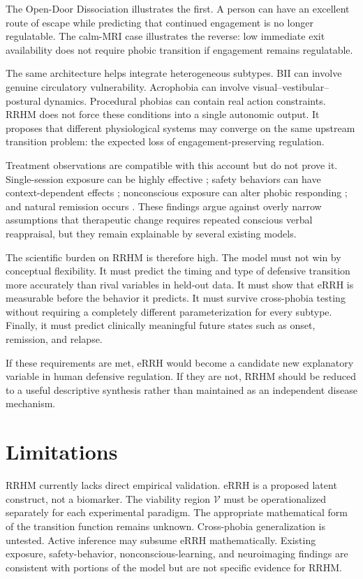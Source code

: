 \documentclass[11pt]{article}
\begin{document}
The Open-Door Dissociation illustrates the first. A person can have an excellent route of escape while predicting that continued engagement is no longer regulatable. The calm-MRI case illustrates the reverse: low immediate exit availability does not require phobic transition if engagement remains regulatable.

The same architecture helps integrate heterogeneous subtypes. BII can involve genuine circulatory vulnerability. Acrophobia can involve visual--vestibular--postural dynamics. Procedural phobias can contain real action constraints. RRHM does not force these conditions into a single autonomic output. It proposes that different physiological systems may converge on the same upstream transition problem: the expected loss of engagement-preserving regulation.

Treatment observations are compatible with this account but do not prove it. Single-session exposure can be highly effective \cite{odgers2022}; safety behaviors can have context-dependent effects \cite{meckes2025}; nonconscious exposure can alter phobic responding \cite{siegel2025}; and natural remission occurs \cite{trumpf2009remission}. These findings argue against overly narrow assumptions that therapeutic change requires repeated conscious verbal reappraisal, but they remain explainable by several existing models.

The scientific burden on RRHM is therefore high. The model must not win by conceptual flexibility. It must predict the timing and type of defensive transition more accurately than rival variables in held-out data. It must show that eRRH is measurable before the behavior it predicts. It must survive cross-phobia testing without requiring a completely different parameterization for every subtype. Finally, it must predict clinically meaningful future states such as onset, remission, and relapse.

If these requirements are met, eRRH would become a candidate new explanatory variable in human defensive regulation. If they are not, RRHM should be reduced to a useful descriptive synthesis rather than maintained as an independent disease mechanism.

\section{Limitations}
RRHM currently lacks direct empirical validation. eRRH is a proposed latent construct, not a biomarker. The viability region $\mathcal V$ must be operationalized separately for each experimental paradigm. The appropriate mathematical form of the transition function remains unknown. Cross-phobia generalization is untested. Active inference may subsume eRRH mathematically. Existing exposure, safety-behavior, nonconscious-learning, and neuroimaging findings are consistent with portions of the model but are not specific evidence for RRHM.
\end{document}
